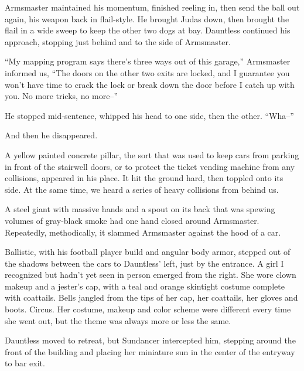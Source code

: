 Armsmaster maintained his momentum, finished reeling in, then send the ball out again, his weapon back in flail-style.  He brought Judas down, then brought the flail in a wide sweep to keep the other two dogs at bay.  Dauntless continued his approach, stopping just behind and to the side of Armsmaster.



``My mapping program says there's three ways out of this garage,'' Armsmaster informed us, ``The doors on the other two exits are locked, and I guarantee you won't have time to crack the lock or break down the door before I catch up with you.  No more tricks, no more--''



He stopped mid-sentence, whipped his head to one side, then the other.  ``Wha--''



And then he disappeared.



A yellow painted concrete pillar, the sort that was used to keep cars from parking in front of the stairwell doors, or to protect the ticket vending machine from any collisions, appeared in his place.  It hit the ground hard, then toppled onto its side.  At the same time, we heard a series of heavy collisions from behind us.



A steel giant with massive hands and a spout on its back that was spewing volumes of gray-black smoke had one hand closed around Armsmaster.  Repeatedly, methodically, it slammed Armsmaster against the hood of a car.



Ballistic, with his football player build and angular body armor, stepped out of the shadows between the cars to Dauntless' left, just by the entrance.  A girl I recognized but hadn't yet seen in person emerged from the right.  She wore clown makeup and a jester's cap, with a teal and orange skintight costume complete with coattails.  Bells jangled from the tips of her cap, her coattails, her gloves and boots.  Circus.  Her costume, makeup and color scheme were different every time she went out, but the theme was always more or less the same.



Dauntless moved to retreat, but Sundancer intercepted him, stepping around the front of the building and placing her miniature sun in the center of the entryway to bar exit.



